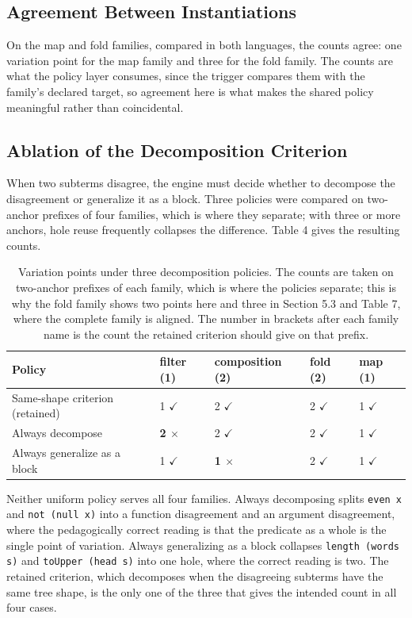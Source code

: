 \documentclass[10pt,twocolumn,letterpaper]{article}
\begin{document}
\subsection{Agreement Between Instantiations}
On the map and fold families, compared in both languages, the counts agree: one
variation point for the map family and three for the fold family. The counts
are what the policy layer consumes, since the trigger compares them with
the family's declared target, so agreement here is what makes the shared
policy meaningful rather than coincidental.

\subsection{Ablation of the Decomposition Criterion}
When two subterms disagree, the engine must decide whether to decompose
the disagreement or generalize it as a block. Three policies were
compared on two-anchor prefixes of four families, which is where they
separate; with three or more anchors, hole reuse frequently collapses
the difference. Table 4 gives the resulting counts.

\begin{table}[t]
\centering\scriptsize
\caption{Variation points under three decomposition policies. The counts are taken on two-anchor prefixes of each family, which is where the policies separate; this is why the fold family shows two points here and three in Section 5.3 and Table 7, where the complete family is aligned. The number in brackets after each family name is the count the retained criterion should give on that prefix.}
\begin{tabular}{@{}p{2.20in}p{0.95in}p{1.05in}p{0.85in}p{1.30in}@{}}
\toprule
Policy & filter (1) & composition (2) & fold (2) & map (1) \\
\midrule
Same-shape criterion (retained) & 1 $\checkmark$ & 2 $\checkmark$ & 2 $\checkmark$ & 1 $\checkmark$ \\
Always decompose & \textbf{2 $\times$} & 2 $\checkmark$ & 2 $\checkmark$ & 1 $\checkmark$ \\
Always generalize as a block & 1 $\checkmark$ & \textbf{1 $\times$} & 2 $\checkmark$ & 1 $\checkmark$ \\
\bottomrule
\end{tabular}
\end{table}

Neither uniform policy serves all four families. Always decomposing
splits \texttt{even x} and \texttt{not (null x)} into a function
disagreement and an argument disagreement, where the pedagogically
correct reading is that the predicate as a whole is the single point of
variation. Always generalizing as a block collapses
\texttt{length (words s)} and \texttt{toUpper (head s)} into one
hole, where the correct reading is two. The retained criterion, which
decomposes when the disagreeing subterms have the same tree shape, is
the only one of the three that gives the intended count in all four
cases.
\end{document}
